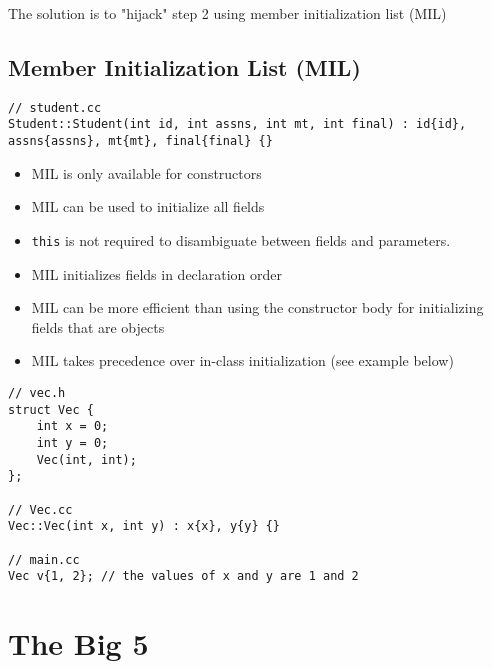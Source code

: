 \documentclass[12pt]{article}
\begin{document}
The solution is to "hijack" step 2 using member initialization list (MIL)

\subsection{Member Initialization List (MIL)}

\begin{lstlisting}
// student.cc
Student::Student(int id, int assns, int mt, int final) : id{id}, assns{assns}, mt{mt}, final{final} {}
\end{lstlisting}

\begin{itemize}
    \item MIL is only available for constructors
    
    \item MIL can be used to initialize all fields
    \item \lstinline{this} is not required to disambiguate between fields and parameters.
    \item MIL initializes fields in declaration order
    \item MIL can be more efficient than using the constructor body for initializing fields that are objects 
    \item MIL takes precedence over in-class initialization (see example below)
\end{itemize}

\begin{lstlisting}
// vec.h
struct Vec {
    int x = 0;
    int y = 0;
    Vec(int, int);
};

// Vec.cc
Vec::Vec(int x, int y) : x{x}, y{y} {}

// main.cc
Vec v{1, 2}; // the values of x and y are 1 and 2
\end{lstlisting}

\section{The Big 5}
\end{document}
